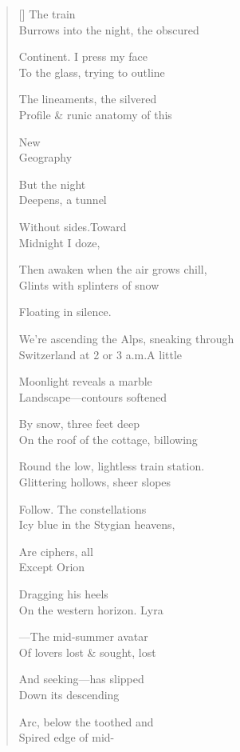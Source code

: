 \label{ch:night_passage}
\settowidth{\versewidth}{We're ascending the Alps, sneaking through}
\begin{verse}[\versewidth]
 \hspace*{2\vgap} The train\\
Burrows into the night, the obscured

Continent. \qquad I press my face\\
To the glass, \qquad trying to outline

The lineaments, the silvered\\
Profile \& runic anatomy of this

New\\
Geography

But the night\\
Deepens, a tunnel

Without sides.\qquad Toward\\
Midnight I doze,

Then awaken when the air grows chill,\\
Glints with splinters of snow

Floating in silence.

We're ascending the Alps, sneaking through\\
Switzerland at 2 or 3 a.m.\qquad A little

Moonlight reveals a marble\\
Landscape---contours softened

By snow, three feet deep\\
On the roof of the cottage, billowing

Round the low, lightless train station.\\
Glittering hollows, sheer slopes

Follow. The constellations\\
Icy blue in the Stygian heavens,

Are ciphers, all\\
Except Orion

Dragging his heels\\
On the western horizon. \qquad Lyra

---The mid-summer avatar\\
Of lovers lost \& sought, lost

And seeking---has slipped\\
Down its descending

Arc, below the toothed and\\
Spired edge of mid-


\end{verse}
